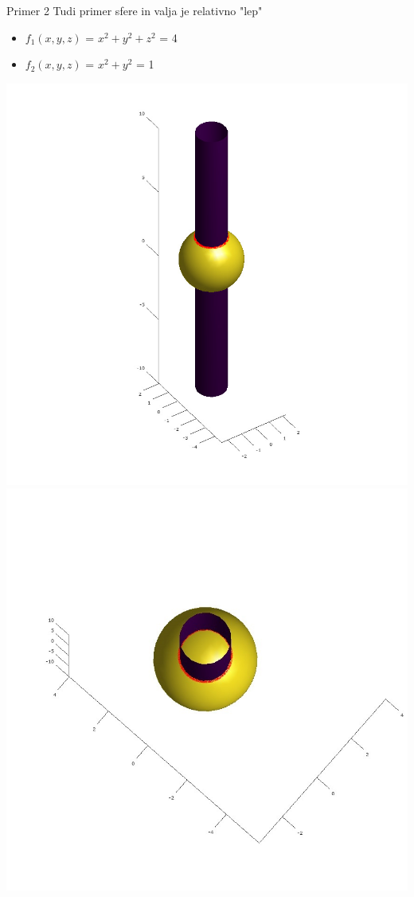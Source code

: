 \documentclass{beamer}
\begin{document}
	\begin{frame}{Primer 2}
		Tudi primer sfere in valja je relativno "lep"\\
		
		\begin{itemize}  
			\item $f_{1}(x,y,z)$ = $x^2 + y^2 + z^2$ = 4
			\item $f_{2}(x,y,z)$ = $x^2 + y^2$ = 1
		\end{itemize} 
		\includegraphics[scale=0.3]{primer2_1}
		\includegraphics[scale=0.3]{primer2_2}
	\end{frame}
	
\end{document}
